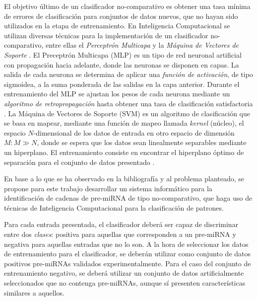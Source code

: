 \documentclass[12pt,bibliography=oldstyle,DIV=12,parskip=full-,titlepage]{scrartcl}
\begin{document}
El objetivo último de un clasificador no-comparativo es obtener una
tasa mínima de errores de clasificación para conjuntos de datos
nuevos, que no hayan sido utilizados en la etapa de entrenamiento.
En Inteligencia Computacional se utilizan diversas técnicas para
la implementación de un clasificador no-comparativo, entre ellas
 el \emph{Perceptrón Multicapa} \cite{mlp1}\cite{mlp2} y la
\emph{Máquina de Vectores de Soporte} \cite{svm}.
El Preceptrón Multicapa (MLP) es un tipo de red neuronal artificial
con propagación hacia adelante, donde las neuronas se disponen en
capas.  La salida de cada neurona se determina de aplicar una
\emph{función de activación}, de tipo sigmoidea, a la suma ponderada
de las salidas en la capa anterior. Durante el entrenamiento del MLP
se ajustan los pesos de cada neurona mediante un \emph{algoritmo de
  retropropagación} hasta obtener una tasa de clasificación
satisfactoria \cite{jain}. 
La Máquina de Vectores de Soporte (SVM) es un algoritmo de
clasificación que se basa en mapear, mediante una función de mapeo
llamada \emph{kernel} (núcleo), el espacio $N$-dimensional de los
datos de entrada en otro espacio de dimensión $M: M\gg N$, donde se
espera que los datos sean linealmente separables mediante un
hiperplano. El entrenamiento consiste en encontrar el hiperplano
óptimo de separación para el conjunto de datos presentado \cite{bottou}.

En base a lo que se ha observado en la bibliografía y al problema
planteado, se propone para este trabajo desarrollar un sistema
informático para la identificación de cadenas de pre-miRNA de tipo
no-comparativo, que haga uso de técnicas de Inteligencia Computacional
para la clasificación de patrones.

Para cada entrada presentada, el clasificador deberá ser capaz de
discriminar entre dos \emph{clases}: positiva para aquellas que
corresponden a un pre-miRNA y negativa para aquellas entradas que no
lo son. A la hora de seleccionar los datos de entrenamiento para el
clasificador, se deberán utilizar como conjunto de datos positivos
pre-miRNAs validados experimentalmente. Para el caso del conjunto de
entrenamiento negativo, se deberá utilizar un conjunto de datos
artificialmente seleccionados que no contenga pre-miRNAs, aunque sí
presenten características similares a aquellos.
\end{document}
